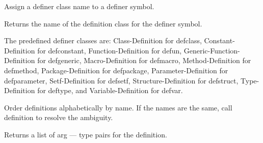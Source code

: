\endDefinition


\beginDefinition


\beginDocumentation
Assign a definer class name to a definer symbol.\endDocumentation
{}\endUsage

\endDefinition


\beginDefinition


\beginDocumentation
Returns the name of the definition class for the \<definer\> symbol.

The predefined definer classes are: 
Class-Definition for defclass,
Constant-Definition for defconstant,
Function-Definition for defun,
Generic-Function-Definition for defgeneric,
Macro-Definition for defmacro,
Method-Definition for defmethod,
Package-Definition for defpackage,
Parameter-Definition for defparameter,
Setf-Definition for defsetf,
Structure-Definition for defstruct,
Type-Definition for deftype,
and
Variable-Definition for defvar.\endDocumentation
{}\endUsage
\beginArguments
{}\endArg
\endArguments
\beginReturn
\singleReturn {}\endcReturn
\endReturn

\endDefinition


\beginDefinition


\beginDocumentation
Order definitions alphabetically by name.
If the names are the same, call \<definition\<\>
to resolve the ambiguity.\endDocumentation
{}\endUsage
\beginArguments
{}\endArg
{}\endArg
\endArguments
\beginReturn
\singleReturn {}\endtReturn
\endReturn

\endDefinition


\beginDefinition


\beginDocumentation
Returns a list of arg --- type pairs for the definition.\endDocumentation
{}\endUsage
\beginArguments
{}\endArg
\endArguments
\beginReturn
\singleReturn {}\endtReturn
\endReturn

